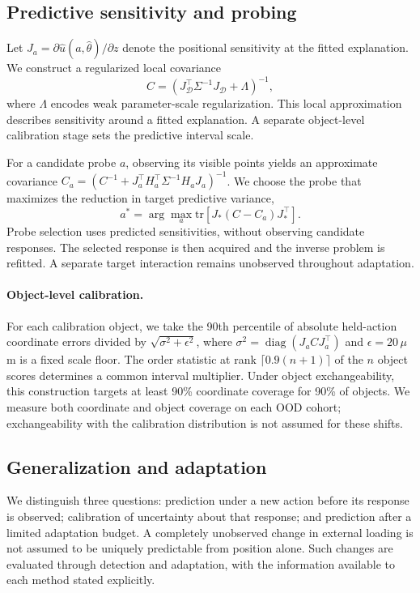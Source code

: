 \documentclass[10pt,twocolumn,letterpaper]{article}
\begin{document}
\subsection{Predictive sensitivity and probing}
Let $J_a=\partial \hat u(a,\hat\theta)/\partial z$ denote the positional sensitivity at the fitted explanation. We construct a regularized local covariance
\begin{equation}
 C=\left(J_{\mathcal D}^{\top}\Sigma^{-1}J_{\mathcal D}+\Lambda\right)^{-1},
\end{equation}
where $\Lambda$ encodes weak parameter-scale regularization. This local approximation describes sensitivity around a fitted explanation. A separate object-level calibration stage sets the predictive interval scale.

For a candidate probe $a$, observing its visible points yields an approximate covariance $C_a=(C^{-1}+J_a^{\top}H_a^{\top}\Sigma^{-1}H_aJ_a)^{-1}$. We choose the probe that maximizes the reduction in target predictive variance,
\begin{equation}
 a^*=\arg\max_a\mathrm{tr}\!\left[J_*\left(C-C_a\right)J_*^{\top}\right].
\end{equation}
Probe selection uses predicted sensitivities, without observing candidate responses. The selected response is then acquired and the inverse problem is refitted. A separate target interaction remains unobserved throughout adaptation.

\paragraph{Object-level calibration.}
For each calibration object, we take the 90th percentile of absolute held-action coordinate errors divided by $\sqrt{\sigma^2+\epsilon^2}$, where $\sigma^2=\operatorname{diag}(J_aCJ_a^\top)$ and $\epsilon=20\,\mu$m is a fixed scale floor. The order statistic at rank $\lceil0.9(n+1)\rceil$ of the $n$ object scores determines a common interval multiplier. Under object exchangeability, this construction targets at least 90\% coordinate coverage for 90\% of objects. We measure both coordinate and object coverage on each OOD cohort; exchangeability with the calibration distribution is not assumed for these shifts.

\subsection{Generalization and adaptation}
We distinguish three questions: prediction under a new action before its response is observed; calibration of uncertainty about that response; and prediction after a limited adaptation budget. A completely unobserved change in external loading is not assumed to be uniquely predictable from position alone. Such changes are evaluated through detection and adaptation, with the information available to each method stated explicitly.
\end{document}
